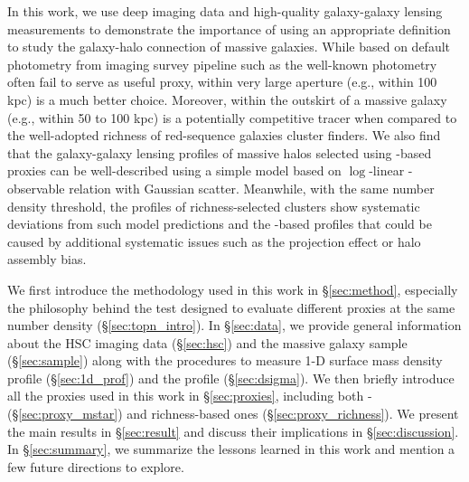 \documentclass[fleqn,usenatbib,useAMS,english]{mnras}
\begin{document}
    In this work, we use deep imaging data and high-quality galaxy-galaxy lensing measurements
    to demonstrate the importance of using an appropriate \mstar{} definition to study the
    galaxy-halo connection of massive galaxies.
    While \mstar{} based on default photometry from imaging survey pipeline such as the
    well-known \cmodel{} photometry often fail to serve as useful \mvir{} proxy, \mstar{}
    within very large aperture (e.g., within 100 kpc) is a much better choice.
    Moreover, \mstar{} within the outskirt of a massive galaxy (e.g., \mstar{} within 50 to 100 kpc)
    is a potentially competitive \mvir{} tracer when compared to the well-adopted richness of
    red-sequence galaxies cluster finders.
    We also find that the galaxy-galaxy lensing \dsigma{} profiles of massive halos selected
    using \mstar{}-based proxies can be well-described using a simple model based on $\log$-linear
    \mvir{}-observable relation with Gaussian scatter.
    Meanwhile, with the same number density threshold, the \dsigma{} profiles of richness-selected
    clusters show systematic deviations from such model predictions and the \mstar{}-based profiles
    that could be caused by additional systematic issues such as the projection effect or
    halo assembly bias.


    We first introduce the methodology used in this work in \S \ref{sec:method}, especially the
    philosophy behind the \topn{} test designed to evaluate different \mvir{} proxies at the
    same number density (\S \ref{sec:topn_intro}).
    In \S \ref{sec:data}, we provide general information about the HSC imaging data
    (\S \ref{sec:hsc}) and the massive galaxy sample (\S \ref{sec:sample}) along with the
    procedures to measure 1-D surface mass density profile (\S \ref{sec:1d_prof}) and the
    \dsigma{} profile (\S \ref{sec:dsigma}).
    We then briefly introduce all the \mvir{} proxies used in this work in \S \ref{sec:proxies},
    including both \mstar{}- (\S \ref{sec:proxy_mstar}) and richness-based ones
    (\S \ref{sec:proxy_richness}).
    We present the main results in \S \ref{sec:result} and
    discuss their implications in \S \ref{sec:discussion}.
    In \S \ref{sec:summary}, we summarize the lessons learned in this work and mention a few
    future directions to explore.
\end{document}

